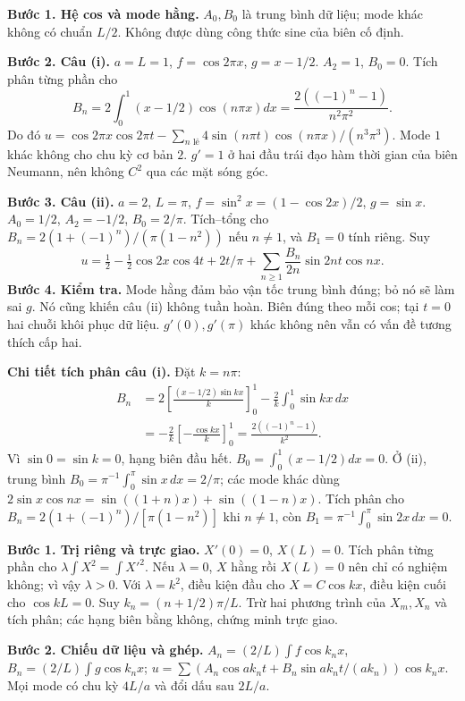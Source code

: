 \textbf{Bước 1. Hệ cos và mode hằng.} $A_0,B_0$ là trung bình dữ liệu; mode khác không có chuẩn $L/2$. Không được dùng công thức sine của biên cố định.

\textbf{Bước 2. Câu (i).} $a=L=1$, $f=\cos2\pi x$, $g=x-1/2$. $A_2=1$, $B_0=0$. Tích phân từng phần cho
\[B_n=2\int_0^1(x-1/2)\cos(n\pi x)dx=\frac{2((-1)^n-1)}{n^2\pi^2}.\]
Do đó $u=\cos2\pi x\cos2\pi t-\sum_{n\text{ lẻ}}4\sin(n\pi t)\cos(n\pi x)/(n^3\pi^3)$. Mode $1$ khác không cho chu kỳ cơ bản $2$. $g'=1$ ở hai đầu trái đạo hàm thời gian của biên Neumann, nên không $C^2$ qua các mặt sóng góc.

\textbf{Bước 3. Câu (ii).} $a=2$, $L=\pi$, $f=\sin^2x=(1-\cos2x)/2$, $g=\sin x$. $A_0=1/2$, $A_2=-1/2$, $B_0=2/\pi$. Tích–tổng cho $B_n=2(1+(-1)^n)/(\pi(1-n^2))$ nếu $n\ne1$, và $B_1=0$ tính riêng. Suy
\[u=\tfrac12-\tfrac12\cos2x\cos4t+2t/\pi+\sum_{n\ge1}\frac{B_n}{2n}\sin2nt\cos nx.\]
\textbf{Bước 4. Kiểm tra.} Mode hằng đảm bảo vận tốc trung bình đúng; bỏ nó sẽ làm sai $g$. Nó cũng khiến câu (ii) không tuần hoàn. Biên đúng theo mỗi cos; tại $t=0$ hai chuỗi khôi phục dữ liệu. $g'(0),g'(\pi)$ khác không nên vẫn có vấn đề tương thích cấp hai.

\textbf{Chi tiết tích phân câu (i).} Đặt $k=n\pi$:
\[\begin{aligned}
B_n&=2\left[\frac{(x-1/2)\sin kx}{k}\right]_0^1-\frac2k\int_0^1\sin kx\,dx\\
&=-\frac2k\left[-\frac{\cos kx}{k}\right]_0^1
=\frac{2((-1)^n-1)}{k^2}.
\end{aligned}\]
Vì $\sin0=\sin k=0$, hạng biên đầu hết. $B_0=\int_0^1(x-1/2)dx=0$. Ở (ii), trung bình $B_0=\pi^{-1}\int_0^\pi\sin x\,dx=2/\pi$; các mode khác dùng $2\sin x\cos nx=\sin((1+n)x)+\sin((1-n)x)$. Tích phân cho $B_n=2(1+(-1)^n)/[\pi(1-n^2)]$ khi $n\ne1$, còn $B_1=\pi^{-1}\int_0^\pi\sin2x\,dx=0$.

\textbf{Bước 1. Trị riêng và trực giao.} $X'(0)=0$, $X(L)=0$. Tích phân từng phần cho $\lambda\int X^2=\int X'^2$. Nếu $\lambda=0$, $X$ hằng rồi $X(L)=0$ nên chỉ có nghiệm không; vì vậy $\lambda>0$. Với $\lambda=k^2$, điều kiện đầu cho $X=C\cos kx$, điều kiện cuối cho $\cos kL=0$. Suy $k_n=(n+1/2)\pi/L$. Trừ hai phương trình của $X_m,X_n$ và tích phân; các hạng biên bằng không, chứng minh trực giao.

\textbf{Bước 2. Chiếu dữ liệu và ghép.} $A_n=(2/L)\int f\cos k_nx$, $B_n=(2/L)\int g\cos k_nx$; $u=\sum(A_n\cos ak_nt+B_n\sin ak_nt/(ak_n))\cos k_nx$. Mọi mode có chu kỳ $4L/a$ và đổi dấu sau $2L/a$.


